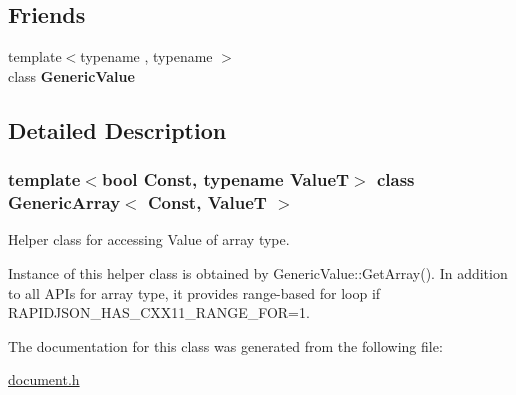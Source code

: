\subsection*{Friends}
\begin{DoxyCompactItemize}
\item 
\mbox{\label{a02076_a899449e1a645b5e377af059fb61113d8}} 
{\footnotesize template$<$typename , typename $>$ }\\class {\bfseries Generic\+Value}
\end{DoxyCompactItemize}


\subsection{Detailed Description}
\subsubsection*{template$<$bool Const, typename ValueT$>$\newline
class Generic\+Array$<$ Const, Value\+T $>$}

Helper class for accessing Value of array type. 

Instance of this helper class is obtained by {\ttfamily Generic\+Value\+::\+Get\+Array()}. In addition to all A\+P\+Is for array type, it provides range-\/based for loop if {\ttfamily R\+A\+P\+I\+D\+J\+S\+O\+N\+\_\+\+H\+A\+S\+\_\+\+C\+X\+X11\+\_\+\+R\+A\+N\+G\+E\+\_\+\+F\+OR=1}. 

The documentation for this class was generated from the following file\+:\begin{DoxyCompactItemize}
\item 
\hyperlink{a00476}{document.\+h}\end{DoxyCompactItemize}
